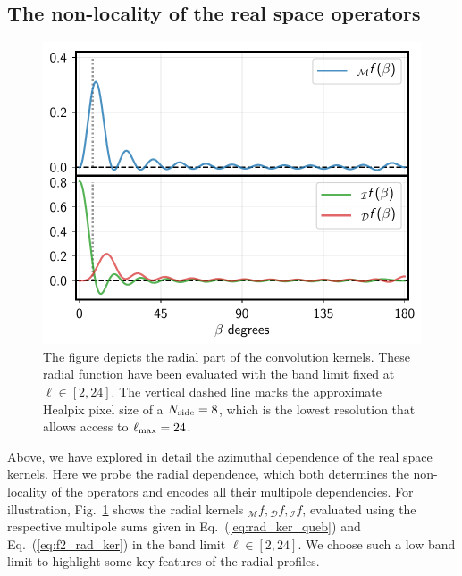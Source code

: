 \documentclass[a4paper,11pt]{article}
\newcommand{\mm}{\mathcal{M}}
\newcommand{\md}{\mathcal{D}}
\newcommand{\mi}{\mathcal{I}}
\def\eq#1{{Eq.~(\ref{#1})}}
\def\fig#1{{Fig.~\ref{#1}}}
\begin{document}
\subsection{The non-locality of the real space operators} \label{sec:radial_locality}
%
\begin{figure}[t]
\centering
\includegraphics[width=0.8\columnwidth]{beta_kernel.pdf}
\caption{The figure depicts the radial part of the convolution kernels. These radial function have been evaluated with the band limit fixed at $\ell \in [2,24]$. The vertical dashed line marks the approximate Healpix pixel size of a $N_{\rm side}=8$, which is the lowest resolution that allows access to $\ell_{\rm max}=24$.}
\label{fig:beta_kernel}
\end{figure}
%
Above, we have explored in detail the  azimuthal dependence of the real space kernels.  Here we probe the radial dependence, which both  determines the non-locality of the operators and encodes all their multipole dependencies. For illustration, \fig{fig:beta_kernel} shows the radial kernels ${_{\mm}f}, {_{\md}f},{_{\mi}f}$, evaluated using the respective multipole sums given in \eq{eq:rad_ker_queb} and \eq{eq:f2_rad_ker} in the band limit $\ell \in [2,24]$. We choose such a low band limit to highlight some key features of the radial profiles.
%
\end{document}
